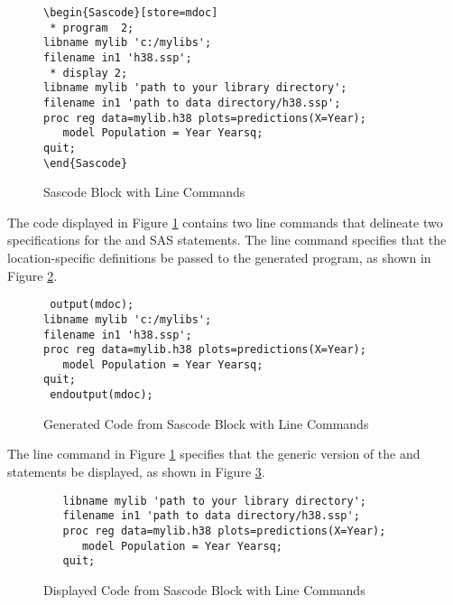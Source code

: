 \documentclass[article,oneside]{memoir}
\begin{document}
\begin{figure}[H]
\begin{snugshade}
\begin{verbatim} 
\begin{Sascode}[store=mdoc]
 * program  2;
libname mylib 'c:/mylibs';
filename in1 'h38.ssp';
 * display 2;
libname mylib 'path to your library directory';
filename in1 'path to data directory/h38.ssp';
proc reg data=mylib.h38 plots=predictions(X=Year);
   model Population = Year Yearsq;
quit;
\end{Sascode}
\end{verbatim}
\end{snugshade}
\caption{Sascode Block with Line Commands}\label{sblc}
\end{figure}
  The code displayed in Figure \ref{sblc} contains
  two line commands that delineate two
  specifications for the  and  SAS statements. 
  The line command  specifies that the location-specific 
  definitions be passed to the generated program,
   as shown in Figure \ref{fig:gsblc}. 
\begin{figure}[H]
\begin{snugshade}
\begin{verbatim} 
 output(mdoc);
libname mylib 'c:/mylibs';
filename in1 'h38.ssp';
proc reg data=mylib.h38 plots=predictions(X=Year);
   model Population = Year Yearsq;
quit;
 endoutput(mdoc);
\end{verbatim}
\end{snugshade}
\caption{Generated Code from Sascode Block with Line Commands}\label{fig:gsblc}
\end{figure}
  
  The line command  in Figure \ref{sblc} 
  specifies that the generic version
  of the  and  statements be displayed,
  as shown in Figure \ref{dsblc}. 
\begin{figure}[H]
\begin{snugshade}
\begin{verbatim} 
   libname mylib 'path to your library directory';
   filename in1 'path to data directory/h38.ssp';
   proc reg data=mylib.h38 plots=predictions(X=Year);
      model Population = Year Yearsq;
   quit;
\end{verbatim}
\end{snugshade}
\caption{Displayed Code from Sascode Block with Line Commands}\label{dsblc}
\end{figure}
\end{document}
